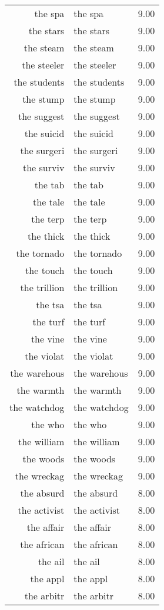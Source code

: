 \begin{table}[ht]
\begin{tabular}{rlr}
  the spa & the spa & 9.00 \\ 
  the stars & the stars & 9.00 \\ 
  the steam & the steam & 9.00 \\ 
  the steeler & the steeler & 9.00 \\ 
  the students & the students & 9.00 \\ 
  the stump & the stump & 9.00 \\ 
  the suggest & the suggest & 9.00 \\ 
  the suicid & the suicid & 9.00 \\ 
  the surgeri & the surgeri & 9.00 \\ 
  the surviv & the surviv & 9.00 \\ 
  the tab & the tab & 9.00 \\ 
  the tale & the tale & 9.00 \\ 
  the terp & the terp & 9.00 \\ 
  the thick & the thick & 9.00 \\ 
  the tornado & the tornado & 9.00 \\ 
  the touch & the touch & 9.00 \\ 
  the trillion & the trillion & 9.00 \\ 
  the tsa & the tsa & 9.00 \\ 
  the turf & the turf & 9.00 \\ 
  the vine & the vine & 9.00 \\ 
  the violat & the violat & 9.00 \\ 
  the warehous & the warehous & 9.00 \\ 
  the warmth & the warmth & 9.00 \\ 
  the watchdog & the watchdog & 9.00 \\ 
  the who & the who & 9.00 \\ 
  the william & the william & 9.00 \\ 
  the woods & the woods & 9.00 \\ 
  the wreckag & the wreckag & 9.00 \\ 
  the absurd & the absurd & 8.00 \\ 
  the activist & the activist & 8.00 \\ 
  the affair & the affair & 8.00 \\ 
  the african & the african & 8.00 \\ 
  the ail & the ail & 8.00 \\ 
  the appl & the appl & 8.00 \\ 
  the arbitr & the arbitr & 8.00 \\ 

\end{tabular}
\end{table}
